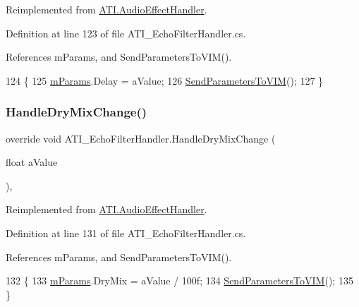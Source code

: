 Reimplemented from \hyperlink{class_a_t_i_1_1_audio_effect_handler_a5371fca4c2e86cecfc264dfc7559b6bd}{A\+T\+I.\+Audio\+Effect\+Handler}.



Definition at line 123 of file A\+T\+I\+\_\+\+Echo\+Filter\+Handler.\+cs.



References m\+Params, and Send\+Parameters\+To\+V\+I\+M().


\begin{DoxyCode}
124     \{
125         \hyperlink{class_a_t_i___echo_filter_handler_afe435170679cf364951083e6f6ffab36}{mParams}.Delay = aValue;
126         \hyperlink{class_a_t_i___echo_filter_handler_afacef95c6ac470707d2bd092031efac0}{SendParametersToVIM}();
127     \}
\end{DoxyCode}
\mbox{\label{class_a_t_i___echo_filter_handler_afc69af9ea7789eb655c01c851594716a}} 
\subsubsection{\texorpdfstring{Handle\+Dry\+Mix\+Change()}{HandleDryMixChange()}}
{\footnotesize\ttfamily override void A\+T\+I\+\_\+\+Echo\+Filter\+Handler.\+Handle\+Dry\+Mix\+Change (\begin{DoxyParamCaption}\item[{float}]{a\+Value }\end{DoxyParamCaption})\hspace{0.3cm}{\ttfamily [protected]}, {\ttfamily [virtual]}}



Reimplemented from \hyperlink{class_a_t_i_1_1_audio_effect_handler_a8d83371e2e982373b4eb04198a8514fb}{A\+T\+I.\+Audio\+Effect\+Handler}.



Definition at line 131 of file A\+T\+I\+\_\+\+Echo\+Filter\+Handler.\+cs.



References m\+Params, and Send\+Parameters\+To\+V\+I\+M().


\begin{DoxyCode}
132     \{
133         \hyperlink{class_a_t_i___echo_filter_handler_afe435170679cf364951083e6f6ffab36}{mParams}.DryMix = aValue / 100f;
134         \hyperlink{class_a_t_i___echo_filter_handler_afacef95c6ac470707d2bd092031efac0}{SendParametersToVIM}();
135     \}
\end{DoxyCode}
\mbox{\label{class_a_t_i___echo_filter_handler_aef6df1fd85fb153d232191f1bd4de5f3}} 

